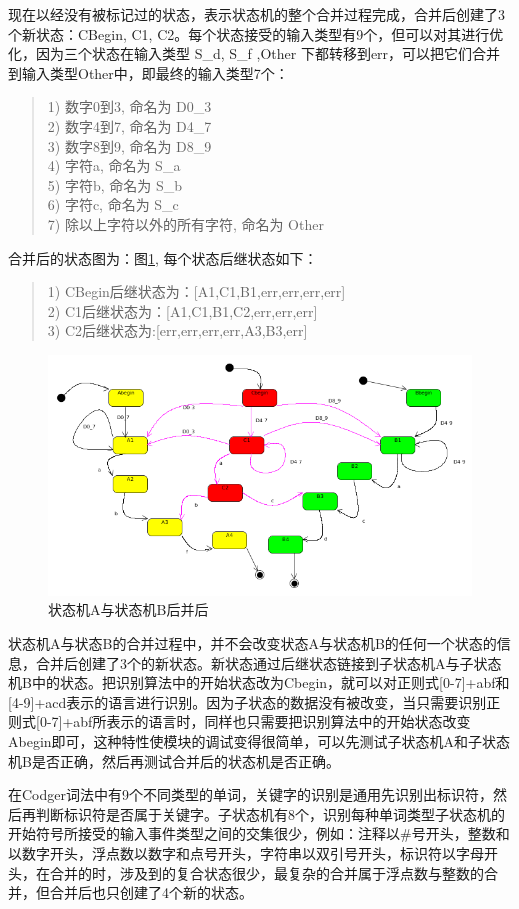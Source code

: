 现在以经没有被标记过的状态，表示状态机的整个合并过程完成，合并后创建了3个新状态：CBegin, C1, C2。每个状态接受的输入类型有9个，但可以对其进行优化，因为三个状态在输入类型 S\_d, S\_f ,Other 下都转移到err，可以把它们合并到输入类型Other中，即最终的输入类型7个：
\begin{quote}
1) 数字0到3, 命名为 D0\_3 \\
2) 数字4到7, 命名为 D4\_7 \\
3) 数字8到9, 命名为 D8\_9 \\
4) 字符a,  命名为 S\_a \\
5) 字符b,  命名为 S\_b \\
6) 字符c,  命名为 S\_c \\
7) 除以上字符以外的所有字符, 命名为 Other
\end{quote}
合并后的状态图为：图\ref{fig:state_c}, 每个状态后继状态如下：
\begin{quote}
1) CBegin后继状态为：[A1,C1,B1,err,err,err,err]  \\
2) C1后继状态为：[A1,C1,B1,C2,err,err,err] \\
3) C2后继状态为:[err,err,err,err,A3,B3,err] 
\end{quote}
\begin{figure}
\centering
\includegraphics[scale=0.8,angle=90]{s_c.png}
\caption{状态机A与状态机B后并后}
\label{fig:state_c}
\end{figure}
状态机A与状态B的合并过程中，并不会改变状态A与状态机B的任何一个状态的信息，合并后创建了3个的新状态。新状态通过后继状态链接到子状态机A与子状态机B中的状态。把识别算法中的开始状态改为Cbegin，就可以对正则式[0-7]+abf和[4-9]+acd表示的语言进行识别。因为子状态的数据没有被改变，当只需要识别正则式[0-7]+abf所表示的语言时，同样也只需要把识别算法中的开始状态改变Abegin即可，这种特性使模块的调试变得很简单，可以先测试子状态机A和子状态机B是否正确，然后再测试合并后的状态机是否正确。

在Codger词法中有9个不同类型的单词，关键字的识别是通用先识别出标识符，然后再判断标识符是否属于关键字。子状态机有8个，识别每种单词类型子状态机的开始符号所接受的输入事件类型之间的交集很少，例如：注释以\#号开头，整数和以数字开头，浮点数以数字和点号开头，字符串以双引号开头，标识符以字母开头，在合并的时，涉及到的复合状态很少，最复杂的合并属于浮点数与整数的合并，但合并后也只创建了4个新的状态。

